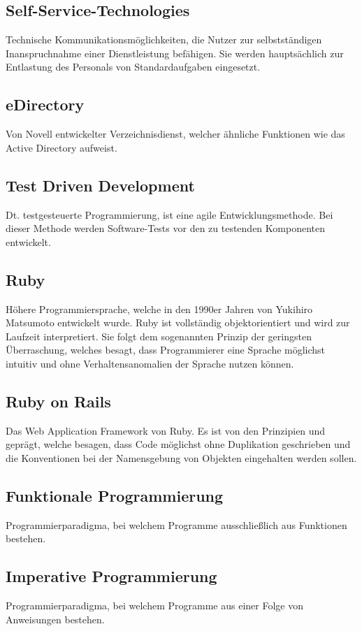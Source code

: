 \subsection*{Self-Service-Technologies}
Technische Kommunikationsmöglichkeiten, die Nutzer zur selbstständigen Inanspruchnahme einer
Dienstleistung befähigen. Sie werden hauptsächlich zur Entlastung des Personals von
Standardaufgaben eingesetzt.
\subsection*{eDirectory}
Von Novell entwickelter Verzeichnisdienst, welcher ähnliche Funktionen wie das Active Directory
aufweist.
\subsection*{Test Driven Development}
Dt. testgesteuerte Programmierung, ist eine agile Entwicklungsmethode. Bei dieser Methode werden
Software-Tests vor den zu testenden Komponenten entwickelt.
\subsection*{Ruby}
Höhere Programmiersprache, welche in den 1990er Jahren von Yukihiro Matsumoto entwickelt wurde. Ruby
ist vollständig objektorientiert und wird zur Laufzeit interpretiert. Sie folgt dem sogenannten
Prinzip der geringsten Überraschung, welches besagt, dass Programmierer eine Sprache möglichst
intuitiv und ohne Verhaltensanomalien der Sprache nutzen können.
\subsection*{Ruby on Rails}
Das Web Application Framework von Ruby. Es ist von den Prinzipien  und
 geprägt, welche besagen, dass Code möglichst ohne Duplikation
geschrieben und die Konventionen bei der Namensgebung von Objekten eingehalten werden sollen.
\subsection*{Funktionale Programmierung}
Programmierparadigma, bei welchem Programme ausschließlich aus Funktionen bestehen.
\subsection*{Imperative Programmierung}
Programmierparadigma, bei welchem Programme aus einer Folge von Anweisungen bestehen.
